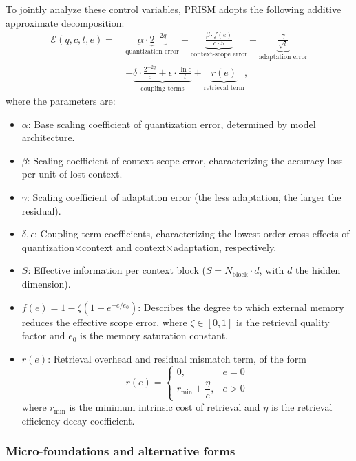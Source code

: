 \documentclass[11pt,a4paper]{article}
\theoremstyle{plain}
\theoremstyle{definition}
\begin{document}
To jointly analyze these control variables, PRISM adopts the following additive approximate decomposition:
\begin{align}
\mathcal{E}(q,c,t,e) =\ & \underbrace{\alpha \cdot 2^{-2q}}_{\text{quantization error}} + \underbrace{\frac{\beta \cdot f(e)}{c \cdot S}}_{\text{context-scope error}} + \underbrace{\frac{\gamma}{\sqrt{t}}}_{\text{adaptation error}} \nonumber \\
& + \underbrace{\delta \cdot \frac{2^{-2q}}{c} + \epsilon \cdot \frac{\ln c}{t}}_{\text{coupling terms}} + \underbrace{r(e)}_{\text{retrieval term}},
\end{align}
where the parameters are:
\begin{itemize}
    \item $\alpha$: Base scaling coefficient of quantization error, determined by model architecture.
    \item $\beta$: Scaling coefficient of context-scope error, characterizing the accuracy loss per unit of lost context.
    \item $\gamma$: Scaling coefficient of adaptation error (the less adaptation, the larger the residual).
    \item $\delta, \epsilon$: Coupling-term coefficients, characterizing the lowest-order cross effects of quantization$\times$context and context$\times$adaptation, respectively.
    \item $S$: Effective information per context block ($S = N_{\text{block}} \cdot d$, with $d$ the hidden dimension).
    \item $f(e) = 1 - \zeta(1 - e^{-e/e_0})$: Describes the degree to which external memory reduces the effective scope error, where $\zeta \in [0,1]$ is the retrieval quality factor and $e_0$ is the memory saturation constant.
    \item $r(e)$: Retrieval overhead and residual mismatch term, of the form
    \[
    r(e) = \begin{cases} 0, & e = 0 \\ r_{\min} + \dfrac{\eta}{e}, & e > 0 \end{cases}
    \]
    where $r_{\min}$ is the minimum intrinsic cost of retrieval and $\eta$ is the retrieval efficiency decay coefficient.
\end{itemize}

\subsubsection*{Micro-foundations and alternative forms}
\end{document}
